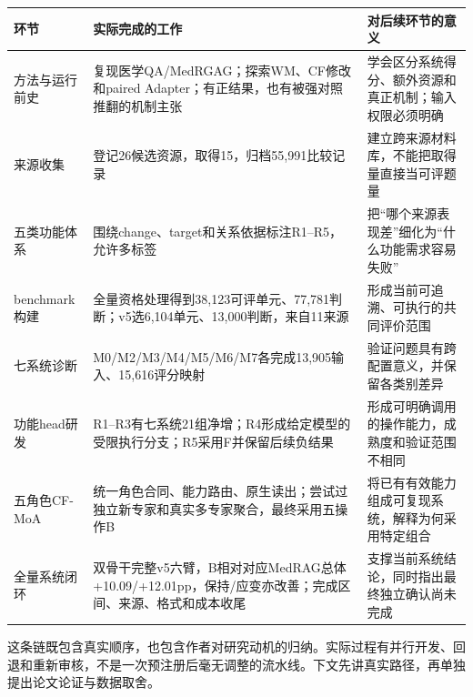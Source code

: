 \documentclass[
  11pt,
  a4paper,
]{article}
\newcounter{none} %
\begin{document}
{\def\LTcaptype{none} %
\begin{longtable}[]{@{}
  >{\raggedright\arraybackslash}p{}
  >{\raggedright\arraybackslash}p{}
  >{\raggedright\arraybackslash}p{}@{}}
\toprule\noalign{}
\begin{minipage}[b]{\linewidth}\raggedright
环节
\end{minipage} & \begin{minipage}[b]{\linewidth}\raggedright
实际完成的工作
\end{minipage} & \begin{minipage}[b]{\linewidth}\raggedright
对后续环节的意义
\end{minipage} \\
\midrule\noalign{}
\endhead
\bottomrule\noalign{}
\endlastfoot
方法与运行前史 & 复现医学QA/MedRGAG；探索WM、CF修改和paired
Adapter；有正结果，也有被强对照推翻的机制主张 &
学会区分系统得分、额外资源和真正机制；输入权限必须明确 \\
来源收集 & 登记26候选资源，取得15，归档55,991比较记录 &
建立跨来源材料库，不能把取得量直接当可评题量 \\
五类功能体系 & 围绕change、target和关系依据标注R1--R5，允许多标签 &
把``哪个来源表现差''细化为``什么功能需求容易失败'' \\
benchmark构建 &
全量资格处理得到38,123可评单元、77,781判断；v5选6,104单元、13,000判断，来自11来源
& 形成当前可追溯、可执行的共同评价范围 \\
七系统诊断 & M0/M2/M3/M4/M5/M6/M7各完成13,905输入、15,616评分映射 &
验证问题具有跨配置意义，并保留各类别差异 \\
功能head研发 &
R1--R3有七系统21组净增；R4形成给定模型的受限执行分支；R5采用F并保留后续负结果
& 形成可明确调用的操作能力，成熟度和验证范围不相同 \\
五角色CF-MoA &
统一角色合同、能力路由、原生读出；尝试过独立新专家和真实多专家聚合，最终采用五操作B
& 将已有有效能力组成可复现系统，解释为何采用特定组合 \\
全量系统闭环 &
双骨干完整v5六臂，B相对对应MedRAG总体+10.09/+12.01pp，保持/应变亦改善；完成区间、来源、格式和成本收尾
& 支撑当前系统结论，同时指出最终独立确认尚未完成 \\
\end{longtable}
}

这条链既包含真实顺序，也包含作者对研究动机的归纳。实际过程有并行开发、回退和重新审核，不是一次预注册后毫无调整的流水线。下文先讲真实路径，再单独提出论文论证与数据取舍。
\end{document}
